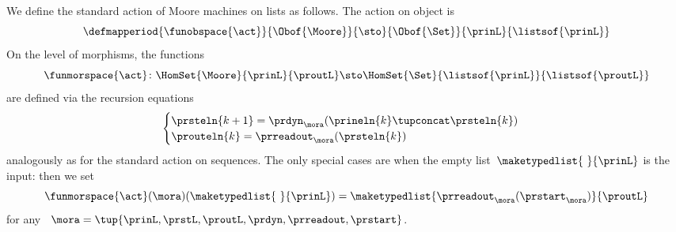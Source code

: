 \begin{definition}
    \label{def:moore-standard-action-on-lists}
    We define the standard action of Moore machines on lists as follows.
    The action on object is
    \begin{equation}
        \defmapperiod{\funobspace{\act}}
        {\Obof{\Moore}}
        {\sto}
        {\Obof{\Set}}
        {\prinL}
        {\listsof{\prinL}}
    \end{equation}
    On the level of morphisms, the functions
    \begin{equation}
        \funmorspace{\act} \colon  \HomSet{\Moore}{\prinL}{\proutL} \sto \HomSet{\Set}{ \listsof{\prinL}}{\listsof{\proutL}}
    \end{equation}
    are defined via the recursion equations
    \begin{equation}
        \begin{cases}
            \prsteln{k+1} = \prdyn_\mora(\prineln{k} \tupconcat \prsteln{k}) \\
            \prouteln{k}   = \prreadout_\mora(\prsteln{k})
        \end{cases}
    \end{equation}
    analogously as for the standard action on sequences.
    The only special cases are when the empty list~$\maketypedlist{\ }{\prinL}$ is the input: then we set
    \begin{equation}
        \funmorspace{\act}(\mora)(\maketypedlist{\ }{\prinL}) = \maketypedlist{ \prreadout_\mora(\prstart_\mora) }{\proutL}
    \end{equation}
    for any ~$\mora = \tup{\prinL,\prstL,\proutL,\prdyn,\prreadout,\prstart}$.
\end{definition}

